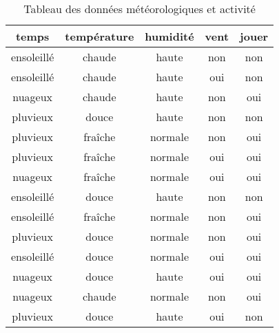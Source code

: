 \documentclass{article}
\begin{document}
\begin{table}[h!]
\centering
\begin{tabular}{|c|c|c|c|c|}
\hline
\textbf{temps} & \textbf{température} & \textbf{humidité} & \textbf{vent} & \textbf{jouer} \\ \hline
ensoleillé & chaude & haute    & non & non \\ \hline
ensoleillé & chaude & haute    & oui & non \\ \hline
nuageux    & chaude & haute    & non & oui \\ \hline
pluvieux   & douce  & haute    & non & non \\ \hline
pluvieux   & fraîche & normale & non & oui \\ \hline
pluvieux   & fraîche & normale & oui & oui \\ \hline
nuageux    & fraîche & normale & oui & oui \\ \hline
ensoleillé & douce  & haute    & non & non \\ \hline
ensoleillé & fraîche & normale & non & oui \\ \hline
pluvieux   & douce  & normale & non & oui \\ \hline
ensoleillé & douce  & normale & oui & oui \\ \hline
nuageux    & douce  & haute    & oui & oui \\ \hline
nuageux    & chaude & normale  & non & oui \\ \hline
pluvieux   & douce  & haute    & oui & non \\ \hline
\end{tabular}
\caption{Tableau des données météorologiques et activité}
\end{table}
\end{document}
